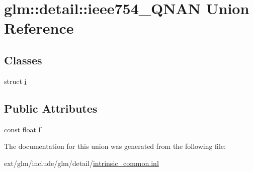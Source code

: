 \hypertarget{unionglm_1_1detail_1_1ieee754___q_n_a_n}{\section{glm\-:\-:detail\-:\-:ieee754\-\_\-\-Q\-N\-A\-N Union Reference}
\label{unionglm_1_1detail_1_1ieee754___q_n_a_n}
}
\subsection*{Classes}
\begin{DoxyCompactItemize}
\item 
struct \hyperlink{structglm_1_1detail_1_1ieee754___q_n_a_n_1_1i}{i}
\end{DoxyCompactItemize}
\subsection*{Public Attributes}
\begin{DoxyCompactItemize}
\item 
\hypertarget{unionglm_1_1detail_1_1ieee754___q_n_a_n_ac5f04f4e605e4d08ddc2bacddf7eee65}{const float {\bfseries f}}\label{unionglm_1_1detail_1_1ieee754___q_n_a_n_ac5f04f4e605e4d08ddc2bacddf7eee65}

\end{DoxyCompactItemize}


The documentation for this union was generated from the following file\-:\begin{DoxyCompactItemize}
\item 
ext/glm/include/glm/detail/\hyperlink{intrinsic__common_8inl}{intrinsic\-\_\-common.\-inl}\end{DoxyCompactItemize}
